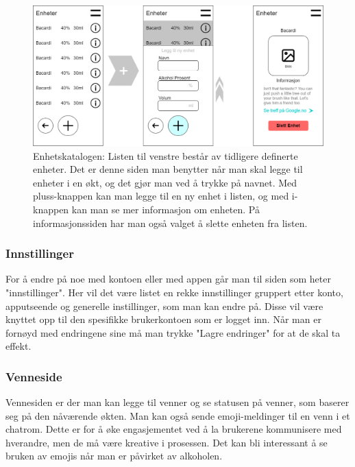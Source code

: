 \begin{figure}[H]
    \centering
    \includegraphics[scale=0.4]{images/lille_promille_unitcatalog.drawio.png}
    \caption{Enhetskatalogen: Listen til venstre består av tidligere definerte enheter. Det er denne siden man benytter når man skal legge til enheter i en økt, og det gjør man ved å trykke på navnet. Med pluss-knappen kan man legge til en ny enhet i listen, og med i-knappen kan man se mer informasjon om enheten. På informasjonssiden har man også valget å slette enheten fra listen.}
\end{figure}

\subsubsection{Innstillinger}
For å endre på noe med kontoen eller med appen går man til siden som heter "innstillinger". Her vil det være listet en rekke innstillinger gruppert etter konto, apputseende og generelle instillinger, som man kan endre på. Disse vil være knyttet opp til den spesifikke brukerkontoen som er logget inn. Når man er fornøyd med endringene sine må man trykke "Lagre endringer" for at de skal ta effekt.

\subsubsection{Venneside}
Vennesiden er der man kan legge til venner og se statusen på venner, som baserer seg på den nåværende økten. Man kan også sende emoji-meldinger til en venn i et chatrom. Dette er for å øke engasjementet ved å la brukerene kommunisere med hverandre, men de må være kreative i prosessen. Det kan bli interessant å se bruken av emojis når man er påvirket av alkoholen. 

